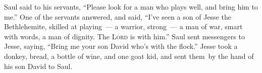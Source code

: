 \begin{inparaenum}
     Saul said to his servants, ``Please look for a man who plays well, and bring him to me.''%
     One of the servants answered, and said, ``I've seen a son of Jesse the Bethlehemite, skilled at playing~--- a warrior, strong~--- a man of war, smart with words, a man of dignity. The \textsc{Lord} is with him.''%
     Saul sent messengers to Jesse, saying, ``Bring me your son David who's with the flock.''%
     Jesse took a donkey, bread, a bottle of wine, and one goat kid, and sent them\understood\ by the hand of his son David to Saul.%
\end{inparaenum}
